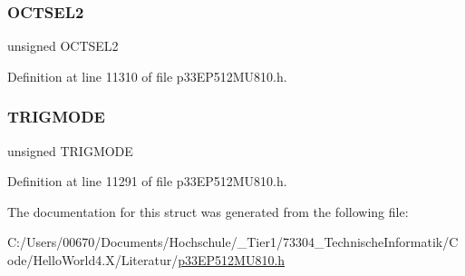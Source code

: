 \subsubsection{\texorpdfstring{O\+C\+T\+S\+E\+L2}{OCTSEL2}}
{\footnotesize\ttfamily unsigned O\+C\+T\+S\+E\+L2}



Definition at line 11310 of file p33\+E\+P512\+M\+U810.\+h.

\mbox{\label{structtag_o_c4_c_o_n1_b_i_t_s_a7a0057e0dca6e2663584b5b9e1da04c3}} 
\subsubsection{\texorpdfstring{T\+R\+I\+G\+M\+O\+DE}{TRIGMODE}}
{\footnotesize\ttfamily unsigned T\+R\+I\+G\+M\+O\+DE}



Definition at line 11291 of file p33\+E\+P512\+M\+U810.\+h.



The documentation for this struct was generated from the following file\+:\begin{DoxyCompactItemize}
\item 
C\+:/\+Users/00670/\+Documents/\+Hochschule/\+\_\+\+Tier1/73304\+\_\+\+Technische\+Informatik/\+Code/\+Hello\+World4.\+X/\+Literatur/\hyperlink{p33_e_p512_m_u810_8h}{p33\+E\+P512\+M\+U810.\+h}\end{DoxyCompactItemize}
